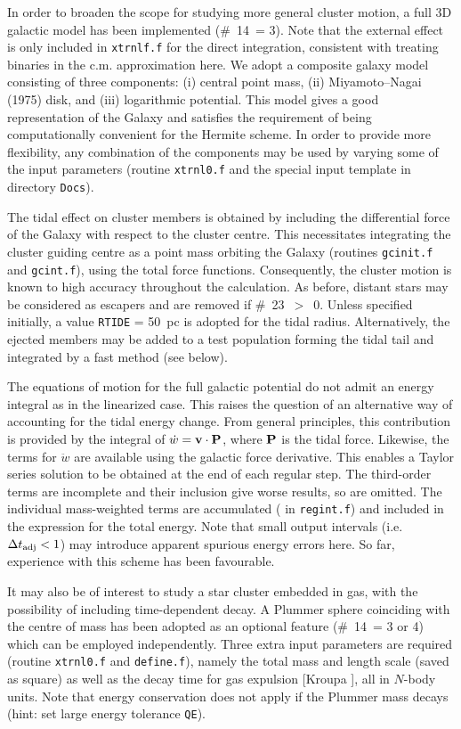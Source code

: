 \documentclass[12pt]{article}
\begin{document}
In order to broaden the scope for studying more general cluster motion, a
full 3D galactic model has been implemented (\#~14~= 3).
Note that the external effect is only included in {\tt xtrnlf.f} for the
direct integration, consistent with treating binaries in the c.m.
approximation here.
We adopt a composite galaxy model consisting of three components:
(i) central point mass, (ii) Miyamoto--Nagai (1975) disk, and (iii)
logarithmic potential.
This model gives a good representation of the Galaxy and satisfies the
requirement of being computationally convenient for the Hermite scheme.
In order to provide more flexibility, any combination of the components may
be used by varying some of the input parameters (\cf routine {\tt xtrnl0.f}
and the special input template in directory {\tt Docs}).

The tidal effect on cluster members is obtained by including the
differential force of the Galaxy with respect to the cluster centre.
This necessitates integrating the cluster guiding centre as a point mass
orbiting the Galaxy (routines {\tt gcinit.f} and {\tt gcint.f}), using the
total force functions.
Consequently, the cluster motion is known to high accuracy throughout
the calculation.
As before, distant stars may be considered as escapers and are removed if
\#~23~$>$~0.
Unless specified initially, a value {\tt RTIDE} = 50~pc is adopted for
the tidal radius.
Alternatively, the ejected members may be added to a test population forming
the tidal tail and integrated by a fast method (see below).

The equations of motion for the full galactic potential do not admit an
energy integral as in the linearized case.
This raises the question of an alternative way of accounting for the tidal
energy change.
From general principles, this contribution is provided by the integral of
$\dot w = {\bf v} \cdot {\bf P}$, where ${\bf P}$ is the tidal force.
Likewise, the terms for ${\ddot w}$ are available using the galactic force
derivative.
This enables a Taylor series solution to be obtained at the end of each
regular step.
The third-order terms are incomplete and their inclusion give worse results,
so are omitted.
The individual mass-weighted terms are accumulated ( in
{\tt regint.f}) and included in the expression for the total energy.
Note that small output intervals (i.e. $\Delta t_{\rm adj} < 1$) may
introduce apparent spurious energy errors here.
So far, experience with this scheme has been favourable.

It may also be of interest to study a star cluster embedded in gas,
with the possibility of including time-dependent decay.
A Plummer sphere coinciding with the centre of mass has been adopted as
an optional feature (\#~14~= 3 or 4) which can be employed independently.
Three extra input parameters are required (\cf routine {\tt xtrnl0.f} and
{\tt define.f}), namely the total mass and length scale (saved as square)
as well as the decay time for gas expulsion [Kroupa ], all in
$N$-body units. Note that energy conservation does not apply if the
Plummer mass decays (hint: set large energy tolerance {\tt QE}).
\end{document}
